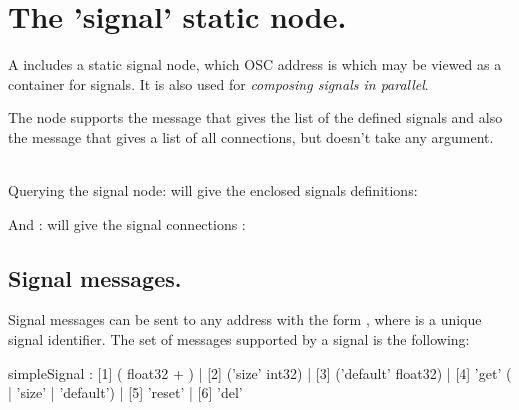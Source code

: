 \documentclass[a4paper,twoside]{report}
\newcommand{\sublevel}[1]	{\section{#1}}
\newcommand{\subsublevel}[1]	{\subsection{#1}}
\newcommand{\sampleindent}	{ \hspace{0.5cm} }
\begin{document}
\sublevel{The 'signal' static node.}
\label{signode}
A  includes a static signal node, which OSC address is  which may be viewed as a container for signals. It is also used for \textit{composing signals in parallel}.

The  node supports the  message that gives the list of the defined signals and also the  message that gives a list of all connections, but doesn't take any argument.

\example \\
Querying the signal node:
\sampleindent will give the enclosed signals definitions:

And :
\sampleindent will give the signal connections :


\subsublevel{Signal messages.}
\label{ssignal}
Signal messages can be sent to any address with the form , where  is a unique signal identifier.
The set of messages supported by a signal is the following:


\begin{rail}
simpleSignal : [1] ( float32 + )
		| [2] ('size' int32) 
		| [3] ('default' float32)
		| [4] 'get' ( | 'size' | 'default')
		| [5] 'reset'
		| [6] 'del'
\end{rail}
\end{document}
